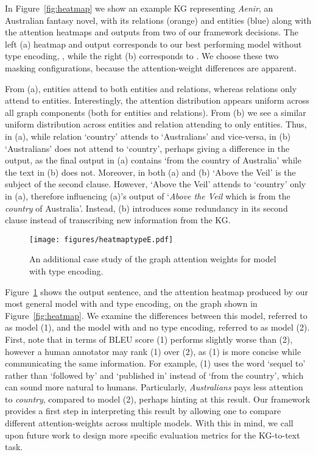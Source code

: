 \documentclass[11pt]{article}
\begin{document}
In Figure~\ref{fig:heatmap} we show an example KG representing \textit{Aenir}, an Australian fantasy novel, with its relations (orange) and entities (blue) along with the attention heatmaps and outputs from two of our framework decisions. The left (a) heatmap and output corresponds to our best performing model without type encoding, , while the right (b) corresponds to . We choose these two masking configurations, because the attention-weight differences are apparent.

From (a), entities attend to both entities and relations, whereas relations only attend to entities. Interestingly, the attention distribution appears uniform across all graph components (both for entities and relations). From (b) we see a similar uniform distribution across entities and relation attending to only entities. Thus, in (a), while relation `country' attends to `Australians' and vice-versa, in (b) `Australians' does not attend to `country', perhaps giving a difference in the output, as the final output in (a) contains `from the country of Australia' while the text in (b) does not. Moreover, in both (a) and (b) `Above the Veil' is the subject of the second clause. However, `Above the Veil' attends to `country' only in (a), therefore influencing (a)'s output of `\textit{Above the Veil} which is from the \textit{country} of Australia'. Instead, (b) introduces some redundancy in its second clause instead of transcribing new information from the KG.

\begin{figure}[t!]
\centering
\texttt{[image: figures/heatmaptypeE.pdf]}
\caption{An additional case study of the graph attention weights for model  with type encoding.}
\label{fig:heatmap-E}
\end{figure}





Figure~\ref{fig:heatmap-E} shows the output sentence, and the attention heatmap produced by our most general model with  and type encoding, on the graph shown in Figure~\ref{fig:heatmap}. We examine the differences between this model, referred to as model (1), and the model with  and no type encoding, referred to as model (2). First, note that in terms of BLEU score (1) performs slightly worse than (2), however a human annotator may rank (1) over (2), as (1) is more concise while communicating the same information. For example, (1) uses the word `sequel to' rather than `followed by' and `published in' instead of `from the country', which can sound more natural to humans. Particularly, \textit{Australians} pays less attention to \textit{country}, compared to model (2), perhaps hinting at this result. Our framework provides a first step in interpreting this result by allowing one to compare different attention-weights across multiple models. With this in mind, we call upon future work to design more specific evaluation metrics for the KG-to-text task.
\end{document}
